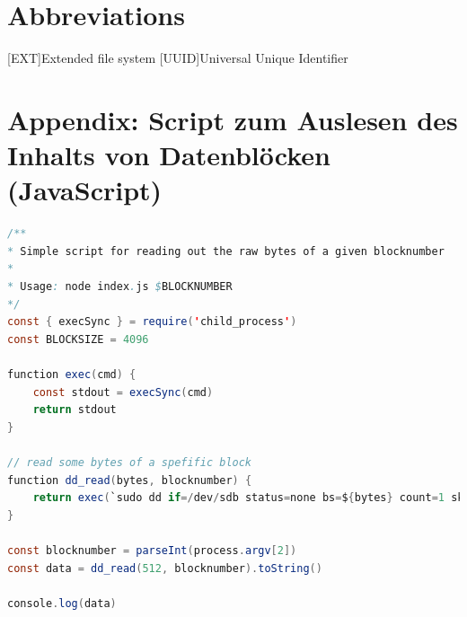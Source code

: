 \documentclass[
11pt,
liststotoc,
bibtotocnumbered,
headheight=34pt     %
]{scrartcl}             %
\newcommand{\centeredpart}[1]{
	\newpage
	\vspace*{\fill}
	\part{#1}
	\vspace*{\fill}
	\newpage
}
\begin{document}
	
	\newpage
	
	\tableofcontents
	\clearpage
	
	\newpage
	

	

	
	\newpage
	\section{Abbreviations}
	\begin{acronym}[SMTP] %
		[EXT]{Extended file system}
		{Universal Unique Identifier}
		
	\end{acronym}
	
	
	\newpage
	
	\printbibliography
	
	\newpage
	\appendix
		
		
		\section{Appendix: Script zum Auslesen des Inhalts von Datenblöcken (JavaScript)}\label{appendix:UtilityScript}

\begin{lstlisting}[language=java]
/**
* Simple script for reading out the raw bytes of a given blocknumber
* 
* Usage: node index.js $BLOCKNUMBER
*/
const { execSync } = require('child_process')
const BLOCKSIZE = 4096

function exec(cmd) {
	const stdout = execSync(cmd)
	return stdout
}

// read some bytes of a spefific block
function dd_read(bytes, blocknumber) {
	return exec(`sudo dd if=/dev/sdb status=none bs=${bytes} count=1 skip=${(BLOCKSIZE * blocknumber) / bytes} | hexdump -Cv` )
}

const blocknumber = parseInt(process.argv[2])
const data = dd_read(512, blocknumber).toString()

console.log(data)
\end{lstlisting}  
	
\end{document}

